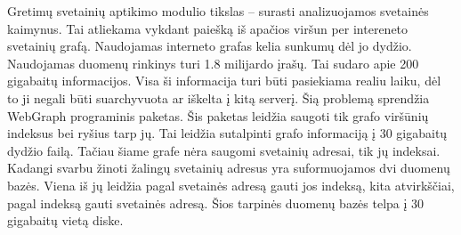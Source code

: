 Gretimų svetainių aptikimo modulio tikslas -- surasti analizuojamos svetainės kaimynus. Tai atliekama vykdant paiešką
iš apačios viršun per intereneto svetainių grafą. Naudojamas interneto grafas kelia sunkumų dėl jo dydžio. Naudojamas
duomenų rinkinys turi 1.8 milijardo įrašų. Tai sudaro apie 200 gigabaitų informacijos. Visa ši informacija turi būti
pasiekiama realiu laiku, dėl to ji negali būti suarchyvuota ar iškelta į kitą serverį.
Šią problemą sprendžia WebGraph programinis paketas. Šis paketas leidžia saugoti tik grafo viršūnių indeksus bei ryšius
 tarp jų. Tai leidžia sutalpinti grafo informaciją į 30 gigabaitų dydžio failą. Tačiau šiame grafe nėra saugomi
 svetainių adresai, tik jų indeksai. Kadangi svarbu žinoti žalingų svetainių adresus yra suformuojamos dvi duomenų
 bazės. Viena iš jų leidžia pagal svetainės adresą gauti jos indeksą, kita atvirkščiai, pagal indeksą gauti svetainės
 adresą. Šios tarpinės duomenų bazės telpa į 30 gigabaitų vietą diske.

\newpage